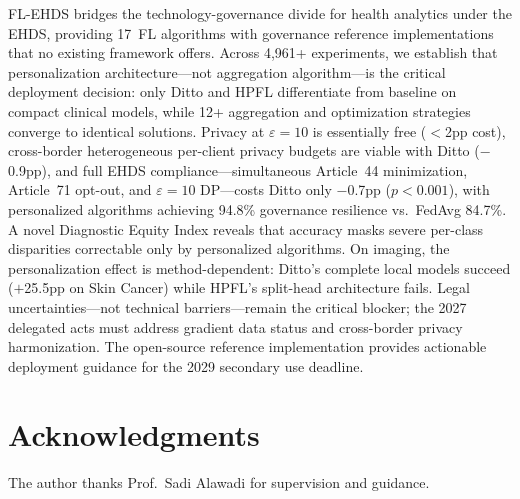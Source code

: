 \documentclass[conference]{IEEEtran}
\begin{document}
FL-EHDS bridges the technology-governance divide for health analytics under the EHDS, providing 17~FL algorithms with governance reference implementations that no existing framework offers. Across 4,961+ experiments, we establish that personalization architecture---not aggregation algorithm---is the critical deployment decision: only Ditto and HPFL differentiate from baseline on compact clinical models, while 12+ aggregation and optimization strategies converge to identical solutions. Privacy at $\varepsilon{=}10$ is essentially free ($<$2pp cost), cross-border heterogeneous per-client privacy budgets are viable with Ditto ($-$0.9pp), and full EHDS compliance---simultaneous Article~44 minimization, Article~71 opt-out, and $\varepsilon{=}10$ DP---costs Ditto only $-$0.7pp ($p{<}0.001$), with personalized algorithms achieving 94.8\% governance resilience vs.\ FedAvg 84.7\%. A novel Diagnostic Equity Index reveals that accuracy masks severe per-class disparities correctable only by personalized algorithms. On imaging, the personalization effect is method-dependent: Ditto's complete local models succeed ($+$25.5pp on Skin Cancer) while HPFL's split-head architecture fails. Legal uncertainties---not technical barriers---remain the critical blocker; the 2027 delegated acts must address gradient data status and cross-border privacy harmonization. The open-source reference implementation provides actionable deployment guidance for the 2029 secondary use deadline.

\section*{Acknowledgments}
The author thanks Prof.~Sadi Alawadi for supervision and guidance.


\end{document}
